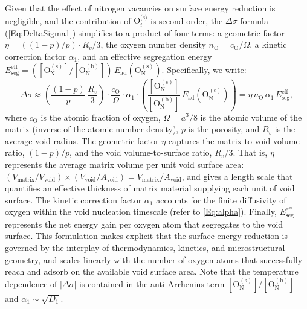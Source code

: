 \documentclass[preprint,12pt,sort&compress]{elsarticle}
\newcommand{\?}{\stackrel{?}{=}}
\begin{document}
Given that the effect of nitrogen vacancies on surface energy reduction is negligible, and the contribution of $\text{O}_i^{\text{(s)}}$ is second order, the $\Delta \sigma$ formula (\cref{Eq:DeltaSigma1}) simplifies to a product of four terms: a geometric factor $\eta = ((1 - p)/p) \cdot R_v/3$, the oxygen number density $n_\text{O} = c_\text{O} / \Omega$, a kinetic correction factor $\alpha_1$, and an effective segregation energy $E_\text{seg}^\text{eff} = ( [\text{O}_\text{N}^{(\text{s})}] / [\text{O}_\text{N}^{(\text{b})}] ) \, E_\text{ad}(\text{O}_\text{N}^{(\text{s})})$. Specifically, we write:
\begin{equation}
\Delta \sigma \approx \left( \frac{(1 - p)}{p} \, \frac{R_v}{3} \right) \cdot \frac{c_\text{O}}{\Omega} \cdot \alpha_1 \cdot \left( \frac{ [ \text{O}_\text{N}^{(\text{s})} ] }{ [ \text{O}_\text{N}^{(\text{b})} ] } \, E_\text{ad}( \text{O}_\text{N}^{(\text{s})} ) \right) = \eta \, n_\text{O} \, \alpha_1 \, E_\text{seg}^\text{eff},
\label{Eq:DeltaSigmaSimple}
\end{equation}
where $c_\text{O}$ is the atomic fraction of oxygen, $\Omega = a^3/8$ is the atomic volume of the matrix (inverse of the atomic number density), $p$ is the porosity, and $R_v$ is the average void radius. The geometric factor $\eta$ captures the matrix-to-void volume ratio, $(1-p)/p$, and the void volume-to-surface ratio, $R_v/3$. That is, $\eta$ represents the average matrix volume per unit void surface area: $(V_\text{matrix}/V_\text{void}) \times (V_\text{void}/A_\text{void}) = V_\text{matrix} / A_\text{void}$, and gives a length scale that quantifies an effective thickness of matrix material 
supplying each unit of void surface. The kinetic correction factor $\alpha_1$ accounts for the finite diffusivity of oxygen within the void nucleation timescale (refer to \cref{Eq:alpha}). Finally, $E_\text{seg}^\text{eff}$ represents the net energy gain per oxygen atom that segregates to the void surface. This formulation makes explicit that the surface energy reduction is governed by the interplay of thermodynamics, kinetics, and microstructural geometry, and scales linearly with the number of oxygen atoms that successfully reach and adsorb on the available void surface area. Note that the temperature dependence of $|\Delta \sigma|$ is contained in the anti-Arrhenius term $[\text{O}_\text{N}^{(\text{s})}] / [\text{O}_\text{N}^{(\text{b})}]$ and $\alpha_1 \sim \sqrt{D_1}$.
\end{document}
